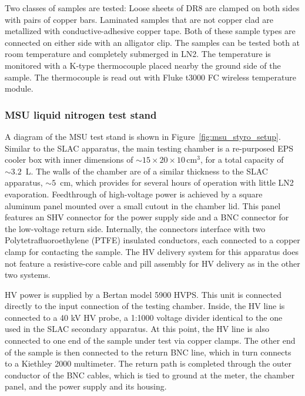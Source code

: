 \documentclass[a4paper,12pt]{article}
\begin{document}
Two classes of samples are tested: 
Loose sheets of DR8 are clamped on both sides with pairs of copper bars. 
Laminated samples that are not copper clad are metallized with conductive-adhesive copper tape. 
Both of these sample types are connected on either side with an alligator clip. 
The samples can be tested both at room temperature and completely submerged in LN2. 
The temperature is monitored with a K-type thermocouple placed nearby the ground side of the sample. 
The thermocouple is read out with Fluke t3000 FC wireless temperature module.


\subsubsection{MSU liquid nitrogen test stand}
\label{sec:MSU}


A diagram of the MSU test stand is shown in Figure~\ref{fig:msu_styro_setup}.  Similar to the SLAC apparatus, the main testing chamber is a re-purposed EPS cooler box with inner dimensions of $\sim 15 \times 20 \times 10\,$cm$^3$, for a total capacity of $\sim 3.2\,$ L.  The walls of the chamber are of a similar thickness to the SLAC apparatus, $\sim 5\,$ cm, which provides for several hours of operation with little LN2 evaporation.  Feedthrough of high-voltage power is achieved by a square aluminum panel mounted over a small cutout in the chamber lid.  This panel features an SHV connector for the power supply side and a BNC connector for the low-voltage return side.  Internally, the connectors interface with two Polytetrafluoroethylene (PTFE) insulated conductors, each connected to a copper clamp for contacting the sample.  The HV delivery system for this apparatus does not feature a resistive-core cable and pill assembly for HV delivery as in the other two systems.

HV power is supplied by a Bertan model 5900 HVPS.  This unit is connected directly to the input connection of the testing chamber.  Inside, the HV line is connected to a 40 kV HV probe, a 1:1000 voltage divider identical to the one used in the SLAC secondary apparatus.  At this point, the HV line is also connected to one end of the sample under test via copper clamps.  The other end of the sample is then connected to the return BNC line, which in turn connects to a Kiethley 2000 multimeter.
The return path is completed through the outer conductor of the BNC cables, which is tied to ground at the meter, the chamber panel, and the power supply and its housing.
\end{document}
